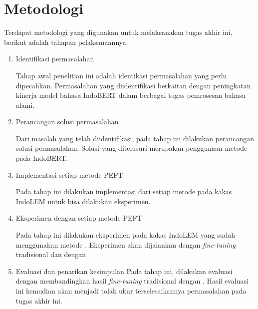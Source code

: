 \section{Metodologi}

Terdapat metodologi yang digunakan untuk melaksanakan tugas akhir ini, berikut adalah tahapan pelaksanaannya.

\begin{enumerate}
    \item Identifikasi permasalahan
    
    Tahap awal penelitian ini adalah identikasi permasalahan yang perlu dipecahkan. Permasalahan yang diidentifikasi berkaitan dengan peningkatan kinerja model bahasa IndoBERT dalam berbagai tugas pemrosesan bahasa alami.

    \item Perancangan solusi permasalahan
    
    Dari masalah yang telah diidentifikasi, pada tahap ini dilakukan perancangan solusi permasalahan. Solusi yang ditelusuri merupakan penggunaan metode \PEFT pada IndoBERT.

    \item Implementasi setiap metode PEFT
    
    Pada tahap ini dilakukan implementasi dari setiap metode \PEFT pada kakas IndoLEM untuk bisa dilakukan eksperimen.

    \item Eksperimen dengan setiap metode PEFT
    
    Pada tahap ini dilakukan eksperimen pada kakas IndoLEM yang sudah menggunakan metode \PEFT. Eksperimen akan dijalankan dengan \textit{fine-tuning} tradisional dan \PEFT dengan 

    \item Evaluasi dan penarikan kesimpulan
    Pada tahap ini, dilakukan evaluasi dengan membandingkan hasil \textit{fine-tuning} tradisional dengan \PEFT. Hasil evaluasi ini kemudian akan menjadi tolak ukur terselesaikannya permasalahan pada tugas akhir ini.

\end{enumerate}
